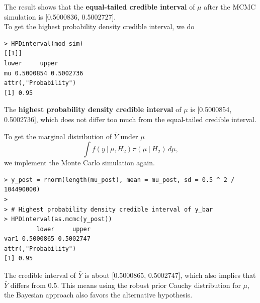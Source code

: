 \documentclass{article}
\begin{document}
The result shows that the \textbf{equal-tailed credible interval} of $\mu$ after the MCMC simulation is [0.5000836, 0.5002727].\\

To get the highest probability density credible interval, we do
\begin{lstlisting}
> HPDinterval(mod_sim)
[[1]]
lower     upper
mu 0.5000854 0.5002736
attr(,"Probability")
[1] 0.95
\end{lstlisting}

The \textbf{highest probability density credible interval} of $\mu$ is [0.5000854, 0.5002736], which does not differ too much from the equal-tailed credible interval.

To get the marginal distribution of $\bar{Y}$ under $\mu$
$$ \int f(\bar{y}~|~\mu, H_2)\pi(\mu~|~H_2)\, d\mu, $$
we implement the Monte Carlo simulation again. 

\begin{lstlisting}
> y_post = rnorm(length(mu_post), mean = mu_post, sd = 0.5 ^ 2 / 104490000)
>
> # Highest probability density credible interval of y_bar
> HPDinterval(as.mcmc(y_post))
         lower     upper
var1 0.5000865 0.5002747
attr(,"Probability")
[1] 0.95
\end{lstlisting}

The credible interval of $\bar{Y}$ is about [0.5000865, 0.5002747], which also implies that $\bar{Y}$ differs from 0.5. This means using the robust prior Cauchy distribution for $\mu$, the Bayesian approach also favors the alternative hypothesis.
\end{document}
